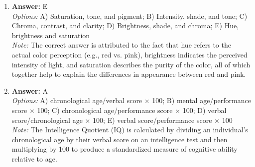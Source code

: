 \documentclass[12pt]{article}
\begin{document}
\begin{enumerate}[label=\arabic*.]
\item \textbf{Answer:} E
\\ \textit{Options:} A) Saturation, tone, and pigment; B) Intensity, shade, and tone; C) Chroma, contrast, and clarity; D) Brightness, shade, and chroma; E) Hue, brightness and saturation
\\ \textit{Note:} The correct answer is attributed to the fact that hue refers to the actual color perception (e.g., red vs. pink), brightness indicates the perceived intensity of light, and saturation describes the purity of the color, all of which together help to explain the differences in appearance between red and pink.
\item \textbf{Answer:} A
\\ \textit{Options:} A) chronological age/verbal score \ensuremath{\times} 100; B) mental age/performance score \ensuremath{\times} 100; C) chronological age/performance score \ensuremath{\times} 100; D) verbal score/chronological age \ensuremath{\times} 100; E) verbal score/performance score \ensuremath{\times} 100
\\ \textit{Note:} The Intelligence Quotient (IQ) is calculated by dividing an individual's chronological age by their verbal score on an intelligence test and then multiplying by 100 to produce a standardized measure of cognitive ability relative to age.
\end{enumerate}
\end{document}
